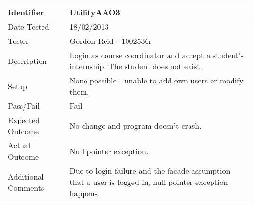 \begin{tabularx}{\textwidth}{|T|L|}
\hline
Identifier & UtilityAAO3\\
\hline
Date Tested & 18/02/2013\\
\hline
Tester & Gordon Reid - 1002536r\\
\hline
Description & Login as course coordinator and accept a student's internship.
The student does not exist.\\
\hline
Setup & None possible - unable to add own users or modify them.\\
\hline
Pass/Fail & Fail\\
\hline
Expected Outcome & No change and program doesn't crash.\\
\hline
Actual Outcome & Null pointer exception.\\
\hline
Additional Comments & Due to login failure and the facade assumption that a
user is logged in, null pointer exception happens.\\
\hline
\end{tabularx}

